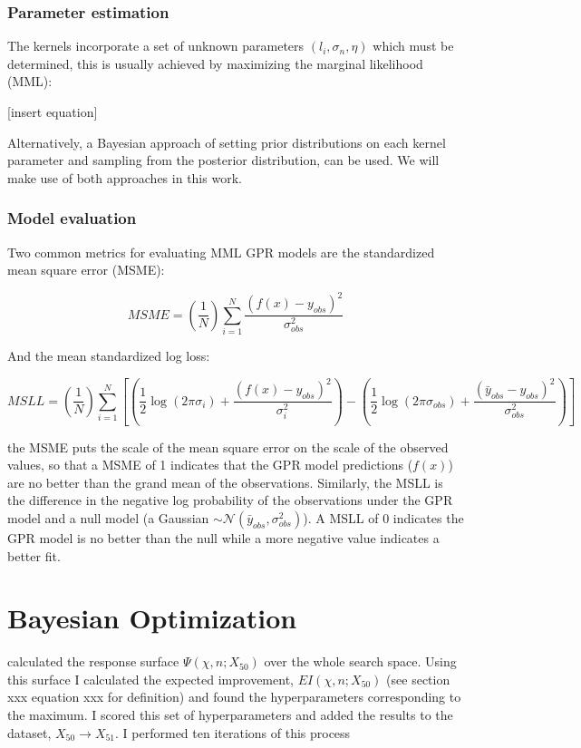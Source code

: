 \subsubsection{Parameter estimation}

The kernels incorporate a set of unknown parameters $({l_i },\sigma_n,\eta)$ which must be determined, this is usually achieved by maximizing the marginal likelihood (MML):

[insert equation]

Alternatively, a Bayesian approach of setting prior distributions on each kernel parameter and sampling from the posterior distribution, can be used. We will make use of both approaches in this work.  

\subsubsection{Model evaluation}
Two common metrics for evaluating MML GPR models are the standardized mean square error (MSME): 

\begin{equation}
M S M E=\left(\frac{1}{N}\right) \sum_{i=1}^{N} \frac{\left(f(x)-y_{o b s}\right)^{2}}{\sigma_{o b s}^{2}}
\end{equation}

And the mean standardized log loss: 

\begin{equation}
M S L L=\left(\frac{1}{N}\right) \sum_{i=1}^{N}\left[\left(\frac{1}{2} \log \left(2 \pi \sigma_{i}\right)+\frac{\left(f(x)-y_{o b s}\right)^{2}}{\sigma_{i}^{2}}\right)-\left(\frac{1}{2} \log \left(2 \pi \sigma_{o b s}\right)+\frac{\left(\bar{y}_{o b s}-y_{o b s}\right)^{2}}{\sigma_{o b s}^{2}}\right)\right]
\end{equation}

the MSME puts the scale of the mean square error on the scale of the observed values, so that a MSME of 1 indicates that the GPR model predictions ($f(x)$) are no better than the grand mean of the observations. Similarly, the MSLL is the difference in the negative log probability  of the observations under the GPR model and a null model (a Gaussian $\sim \mathcal{N}(\bar{y}_{obs},\sigma_{obs}^2 )$). A MSLL of $0$ indicates the GPR model is no better than the null while a more negative value indicates a better fit. 

\section{Bayesian Optimization}\label{sec:BO}

calculated the response surface $\Psi(\chi, n;X_{50})$ over the whole search space. Using this surface I calculated the expected improvement, $EI(\chi, n;X_{50})$ (see section xxx equation xxx for definition) and found the hyperparameters corresponding to the maximum. I scored this set of hyperparameters and added the results to the dataset, $X_{50} \rightarrow X_{51}$. I performed ten iterations of this process 